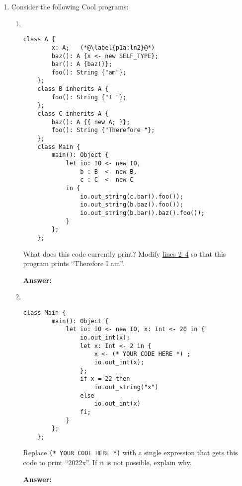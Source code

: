 \documentclass[11pt]{article}
\begin{document}
\begin{enumerate}
\item Consider the following Cool programs:
\begin{enumerate}
    \item ~
    \begin{lstlisting}[gobble=4, emph={x,io,a,b,c}, basicstyle=\small]
    class A {
        x: A;   (*@\label{p1a:ln2}@*)
        baz(): A {x <- new SELF_TYPE};
        bar(): A {baz()};
        foo(): String {"am"};
    };
    class B inherits A {
        foo(): String {"I "};
    };
    class C inherits A {
        baz(): A {{ new A; }};
        foo(): String {"Therefore "};
    };
    class Main {
        main(): Object {
            let io: IO <- new IO,
                b : B  <- new B,
                c : C  <- new C
            in {
                io.out_string(c.bar().foo());
                io.out_string(b.baz().foo());
                io.out_string(b.bar().baz().foo());
            }
        };
    };
    \end{lstlisting}
    What does this code currently print? Modify \hyperref[p1a:ln2]{lines 2--4} so that this program prints ``Therefore I am''.
    \bigskip

    \textbf{Answer:}

    \newpage

    \item ~
    \begin{lstlisting}[gobble=4, emph={io,x}, basicstyle=\small]
    class Main {
        main(): Object {
            let io: IO <- new IO, x: Int <- 20 in {
                io.out_int(x);
                let x: Int <- 2 in {
                    x <- (* YOUR CODE HERE *) ;
                    io.out_int(x);
                };
                if x = 22 then
                    io.out_string("x")
                else
                    io.out_int(x)
                fi;
            }
        };
    };
    \end{lstlisting}
    Replace \lstinline!(* YOUR CODE HERE *)! with a single expression that gets this code to print ``2022x''. If it is not possible, explain why.
    \bigskip

    \textbf{Answer:}

\end{enumerate}

\newpage


\end{enumerate}
\end{document}
